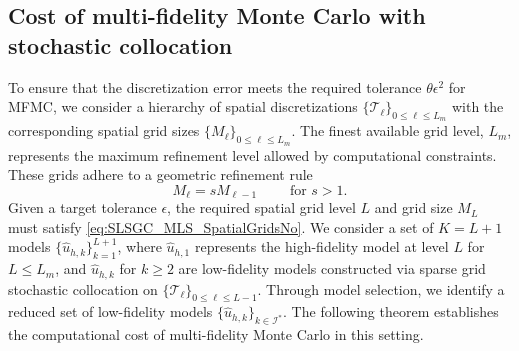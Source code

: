 \subsection{Cost of multi-fidelity Monte Carlo with stochastic collocation}
\label{sec:Cost_MFMC_with_SC}
To ensure that the discretization error meets the required tolerance $\theta \epsilon^2$ for MFMC, we consider a hierarchy of spatial discretizations $\{\mathcal{T}_\ell\}_{0\le \ell \le L_{m}}$ with the corresponding spatial grid sizes $\{M_\ell\}_{0\le \ell \le L_{m}}$. The finest available grid level, $L_m$, represents the maximum refinement level allowed by computational constraints. These grids adhere to a geometric refinement rule
%
\begin{equation}
\label{eq:MeshGrowth}
M_\ell = s M_{\ell-1} \qquad \text{ for } s>1.
\end{equation}
%
Given a target tolerance $\epsilon$, the required spatial grid level $L$ and grid size $M_L$ must satisfy \eqref{eq:SLSGC_MLS_SpatialGridsNo}. We consider a set of $K=L+1$ models $\{\widehat u_{h,k}\}_{k=1}^{L+1}$, where $\widehat u_{h,1}$ represents the high-fidelity model at level $L$ for $L\le L_{m}$, and $\widehat u_{h,k}$ for $k \geq 2$ are low-fidelity models constructed via sparse grid stochastic collocation on $\{\mathcal{T}_\ell\}_{0\le \ell \le L-1}$. Through model selection, we identify a reduced set of low-fidelity models $\{\widehat u_{h,k}\}_{k\in \mathcal{I}^*}$.  The following theorem establishes the computational cost of multi-fidelity Monte Carlo in this setting.


